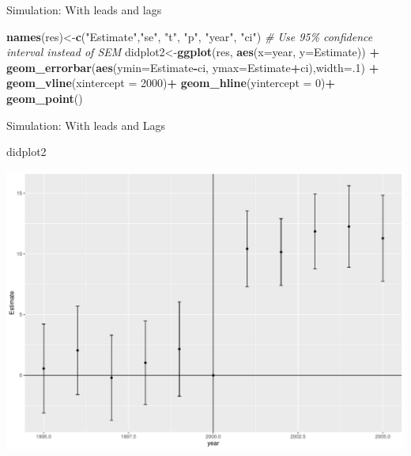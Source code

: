 \documentclass[
  ignorenonframetext,
]{beamer}
\newenvironment{Shaded}{\begin{snugshade}}{\end{snugshade}}
\newcommand{\AttributeTok}[1]{\textcolor[rgb]{0.13,0.29,0.53}{#1}}
\newcommand{\CommentTok}[1]{\textcolor[rgb]{0.56,0.35,0.01}{\textit{#1}}}
\newcommand{\DecValTok}[1]{\textcolor[rgb]{0.00,0.00,0.81}{#1}}
\newcommand{\FunctionTok}[1]{\textcolor[rgb]{0.13,0.29,0.53}{\textbf{#1}}}
\newcommand{\NormalTok}[1]{#1}
\newcommand{\OtherTok}[1]{\textcolor[rgb]{0.56,0.35,0.01}{#1}}
\newcommand{\SpecialCharTok}[1]{\textcolor[rgb]{0.81,0.36,0.00}{\textbf{#1}}}
\newcommand{\StringTok}[1]{\textcolor[rgb]{0.31,0.60,0.02}{#1}}
\begin{document}
\begin{frame}[fragile]{Simulation: With leads and lags}
\begin{Shaded}
\begin{Highlighting}[]
\FunctionTok{names}\NormalTok{(res)}\OtherTok{\textless{}{-}}\FunctionTok{c}\NormalTok{(}\StringTok{"Estimate"}\NormalTok{,}\StringTok{"se"}\NormalTok{, }\StringTok{"t"}\NormalTok{,  }\StringTok{"p"}\NormalTok{, }\StringTok{"year"}\NormalTok{, }\StringTok{"ci"}\NormalTok{)}
\CommentTok{\# Use 95\% confidence interval instead of SEM}
\NormalTok{didplot2}\OtherTok{\textless{}{-}}\FunctionTok{ggplot}\NormalTok{(res, }\FunctionTok{aes}\NormalTok{(}\AttributeTok{x=}\NormalTok{year, }\AttributeTok{y=}\NormalTok{Estimate)) }\SpecialCharTok{+} 
    \FunctionTok{geom\_errorbar}\NormalTok{(}\FunctionTok{aes}\NormalTok{(}\AttributeTok{ymin=}\NormalTok{Estimate}\SpecialCharTok{{-}}\NormalTok{ci, }\AttributeTok{ymax=}\NormalTok{Estimate}\SpecialCharTok{+}\NormalTok{ci),}\AttributeTok{width=}\NormalTok{.}\DecValTok{1}\NormalTok{) }\SpecialCharTok{+}
    \FunctionTok{geom\_vline}\NormalTok{(}\AttributeTok{xintercept =} \DecValTok{2000}\NormalTok{)}\SpecialCharTok{+}
      \FunctionTok{geom\_hline}\NormalTok{(}\AttributeTok{yintercept =} \DecValTok{0}\NormalTok{)}\SpecialCharTok{+}
     \FunctionTok{geom\_point}\NormalTok{()}
\end{Highlighting}
\end{Shaded}
\end{frame}

\begin{frame}[fragile]{Simulation: With leads and Lags}
\protect\hypertarget{simulation-with-leads-and-lags-7}{}
\begin{Shaded}
\begin{Highlighting}[]
\NormalTok{didplot2}
\end{Highlighting}
\end{Shaded}

\includegraphics{Slides_DID_files/figure-beamer/didplot_fig2-1.pdf}
\end{frame}
\end{document}

